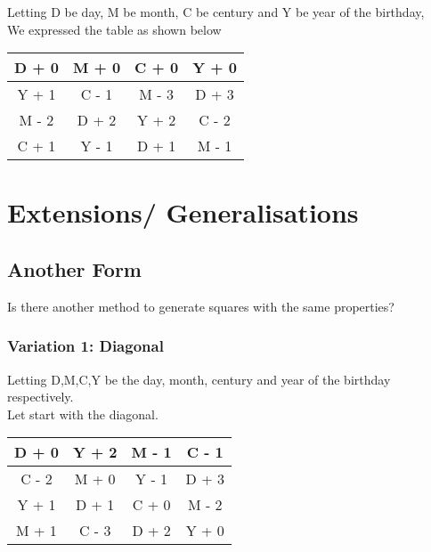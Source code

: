 \documentclass{article}
\begin{document}
\begin{center}
Letting D be day, M be month, C be century and Y be year of the birthday,\\
We expressed the table as shown below\\

\def\arraystretch{2}
\begin{tabular}{|c|c|c|c|}
    \hline
    D + 0 & M + 0 & C + 0 & Y + 0 \\
    \hline
    Y + 1 & C - 1 & M - 3 & D + 3 \\
    \hline
    M - 2 & D + 2 & Y + 2 & C - 2 \\
    \hline
    C + 1 & Y - 1 & D + 1 & M - 1 \\
    \hline
\end{tabular}
\end{center}

\section{Extensions/ Generalisations}
    \subsection{Another Form}
        Is there another method to generate squares with the same properties?
        
    \subsubsection{Variation 1: Diagonal}
        Letting D,M,C,Y be the day, month, century and year of the birthday respectively. \\
        Let start with the diagonal. \\
        \def\arraystretch{2}
        \begin{center}
            \begin{tabular}{|c|c|c|c|}
                \hline
                D + 0 & Y + 2 & M - 1 & C - 1 \\
                \hline
                C - 2 & M + 0 & Y - 1 & D + 3 \\
                \hline
                Y + 1 & D + 1 & C + 0 & M - 2 \\
                \hline
                M + 1 & C - 3 & D + 2 & Y + 0 \\
                \hline
            \end{tabular}
        \end{center}
\end{document}
